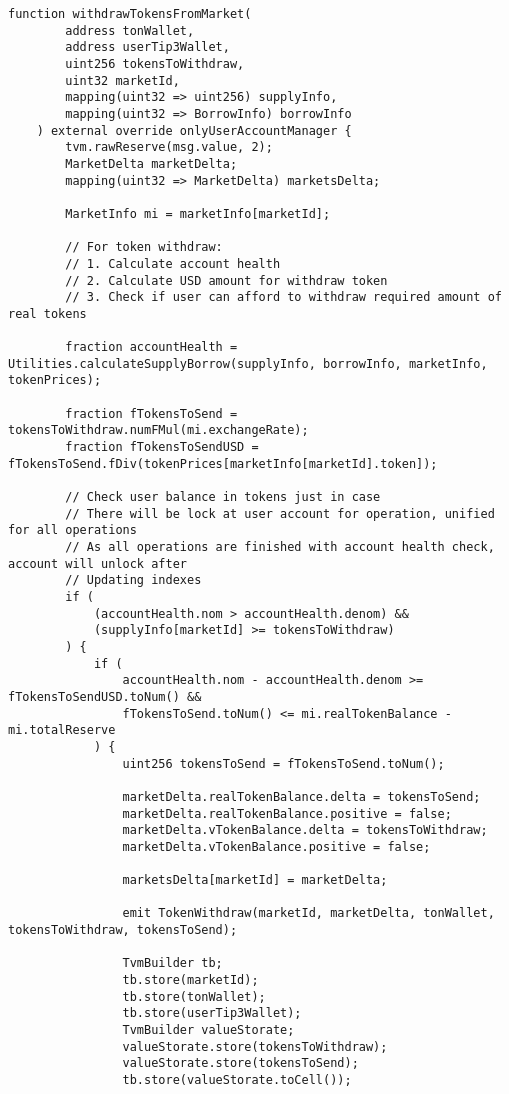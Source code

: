 \begin{lstlisting}[firstnumber=106]
    function withdrawTokensFromMarket(
        address tonWallet, 
        address userTip3Wallet,
        uint256 tokensToWithdraw, 
        uint32 marketId, 
        mapping(uint32 => uint256) supplyInfo,
        mapping(uint32 => BorrowInfo) borrowInfo
    ) external override onlyUserAccountManager {
        tvm.rawReserve(msg.value, 2);
        MarketDelta marketDelta;
        mapping(uint32 => MarketDelta) marketsDelta;

        MarketInfo mi = marketInfo[marketId];

        // For token withdraw:
        // 1. Calculate account health
        // 2. Calculate USD amount for withdraw token
        // 3. Check if user can afford to withdraw required amount of real tokens

        fraction accountHealth = Utilities.calculateSupplyBorrow(supplyInfo, borrowInfo, marketInfo, tokenPrices);

        fraction fTokensToSend = tokensToWithdraw.numFMul(mi.exchangeRate);
        fraction fTokensToSendUSD = fTokensToSend.fDiv(tokenPrices[marketInfo[marketId].token]);

        // Check user balance in tokens just in case
        // There will be lock at user account for operation, unified for all operations
        // As all operations are finished with account health check, account will unlock after
        // Updating indexes
        if (
            (accountHealth.nom > accountHealth.denom) &&
            (supplyInfo[marketId] >= tokensToWithdraw)
        ) {
            if (
                accountHealth.nom - accountHealth.denom >= fTokensToSendUSD.toNum() &&
                fTokensToSend.toNum() <= mi.realTokenBalance - mi.totalReserve
            ) {
                uint256 tokensToSend = fTokensToSend.toNum();

                marketDelta.realTokenBalance.delta = tokensToSend;
                marketDelta.realTokenBalance.positive = false;
                marketDelta.vTokenBalance.delta = tokensToWithdraw;
                marketDelta.vTokenBalance.positive = false;

                marketsDelta[marketId] = marketDelta;

                emit TokenWithdraw(marketId, marketDelta, tonWallet, tokensToWithdraw, tokensToSend);

                TvmBuilder tb;
                tb.store(marketId);
                tb.store(tonWallet);
                tb.store(userTip3Wallet);
                TvmBuilder valueStorate;
                valueStorate.store(tokensToWithdraw);
                valueStorate.store(tokensToSend);
                tb.store(valueStorate.toCell());


\end{lstlisting}
